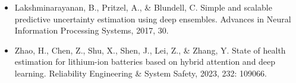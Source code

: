 \documentclass[12pt, a4paper]{ctexart}
\begin{document}
\begin{itemize}
  \item  Lakshminarayanan, B., Pritzel, A., \& Blundell, C. Simple and scalable predictive uncertainty estimation using deep ensembles. Advances in Neural Information Processing Systems, 2017, 30.
\end{itemize}
\begin{itemize}
  \item  Zhao, H., Chen, Z., Shu, X., Shen, J., Lei, Z., \& Zhang, Y. State of health estimation for lithium-ion batteries based on hybrid attention and deep learning. Reliability Engineering \& System Safety, 2023, 232: 109066.
\end{itemize}
\end{document}
